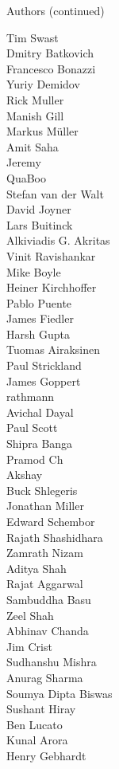 \begin{frame}{Authors (continued)}
\begin{multicols}{5}
Tim Swast\\
Dmitry Batkovich\\
Francesco Bonazzi\\
Yuriy Demidov\\
Rick Muller\\
Manish Gill\\
Markus Müller\\
Amit Saha\\
Jeremy\\
QuaBoo\\
Stefan van der Walt\\
David Joyner\\
Lars Buitinck\\
Alkiviadis G. Akritas\\
Vinit Ravishankar\\
Mike Boyle\\
Heiner Kirchhoffer\\
Pablo Puente\\
James Fiedler\\
Harsh Gupta\\
Tuomas Airaksinen\\
Paul Strickland\\
James Goppert\\
rathmann\\
Avichal Dayal\\
Paul Scott\\
Shipra Banga\\
Pramod Ch\\
Akshay\\
Buck Shlegeris\\
Jonathan Miller\\
Edward Schembor\\
Rajath Shashidhara\\
Zamrath Nizam\\
Aditya Shah\\
Rajat Aggarwal\\
Sambuddha Basu\\
Zeel Shah\\
Abhinav Chanda\\
Jim Crist\\
Sudhanshu Mishra\\
Anurag Sharma\\
Soumya Dipta Biswas\\
Sushant Hiray\\
Ben Lucato\\
Kunal Arora\\
Henry Gebhardt\\

\end{multicols}
\end{frame}
